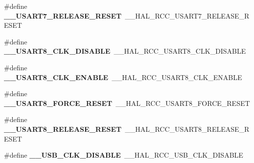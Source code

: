 \begin{DoxyCompactItemize}
\item 
\#define {\bfseries \+\_\+\+\_\+\+U\+S\+A\+R\+T7\+\_\+\+R\+E\+L\+E\+A\+S\+E\+\_\+\+R\+E\+S\+ET}~\+\_\+\+\_\+\+H\+A\+L\+\_\+\+R\+C\+C\+\_\+\+U\+S\+A\+R\+T7\+\_\+\+R\+E\+L\+E\+A\+S\+E\+\_\+\+R\+E\+S\+ET\hypertarget{group___h_a_l___r_c_c___aliased_gafa09a5eefe6ef876ceb35c5c7e927b90}{}\label{group___h_a_l___r_c_c___aliased_gafa09a5eefe6ef876ceb35c5c7e927b90}

\item 
\#define {\bfseries \+\_\+\+\_\+\+U\+S\+A\+R\+T8\+\_\+\+C\+L\+K\+\_\+\+D\+I\+S\+A\+B\+LE}~\+\_\+\+\_\+\+H\+A\+L\+\_\+\+R\+C\+C\+\_\+\+U\+S\+A\+R\+T8\+\_\+\+C\+L\+K\+\_\+\+D\+I\+S\+A\+B\+LE\hypertarget{group___h_a_l___r_c_c___aliased_ga156c3013249722a6533154a3c34cb8e5}{}\label{group___h_a_l___r_c_c___aliased_ga156c3013249722a6533154a3c34cb8e5}

\item 
\#define {\bfseries \+\_\+\+\_\+\+U\+S\+A\+R\+T8\+\_\+\+C\+L\+K\+\_\+\+E\+N\+A\+B\+LE}~\+\_\+\+\_\+\+H\+A\+L\+\_\+\+R\+C\+C\+\_\+\+U\+S\+A\+R\+T8\+\_\+\+C\+L\+K\+\_\+\+E\+N\+A\+B\+LE\hypertarget{group___h_a_l___r_c_c___aliased_gadd38e5a3ecd0dd0f8118af0447a096c9}{}\label{group___h_a_l___r_c_c___aliased_gadd38e5a3ecd0dd0f8118af0447a096c9}

\item 
\#define {\bfseries \+\_\+\+\_\+\+U\+S\+A\+R\+T8\+\_\+\+F\+O\+R\+C\+E\+\_\+\+R\+E\+S\+ET}~\+\_\+\+\_\+\+H\+A\+L\+\_\+\+R\+C\+C\+\_\+\+U\+S\+A\+R\+T8\+\_\+\+F\+O\+R\+C\+E\+\_\+\+R\+E\+S\+ET\hypertarget{group___h_a_l___r_c_c___aliased_ga3a8aed7e7c3dbbb9f4f93d298a813a13}{}\label{group___h_a_l___r_c_c___aliased_ga3a8aed7e7c3dbbb9f4f93d298a813a13}

\item 
\#define {\bfseries \+\_\+\+\_\+\+U\+S\+A\+R\+T8\+\_\+\+R\+E\+L\+E\+A\+S\+E\+\_\+\+R\+E\+S\+ET}~\+\_\+\+\_\+\+H\+A\+L\+\_\+\+R\+C\+C\+\_\+\+U\+S\+A\+R\+T8\+\_\+\+R\+E\+L\+E\+A\+S\+E\+\_\+\+R\+E\+S\+ET\hypertarget{group___h_a_l___r_c_c___aliased_ga2348b929f206d24fa5bd3c4b3315b13d}{}\label{group___h_a_l___r_c_c___aliased_ga2348b929f206d24fa5bd3c4b3315b13d}

\item 
\#define {\bfseries \+\_\+\+\_\+\+U\+S\+B\+\_\+\+C\+L\+K\+\_\+\+D\+I\+S\+A\+B\+LE}~\+\_\+\+\_\+\+H\+A\+L\+\_\+\+R\+C\+C\+\_\+\+U\+S\+B\+\_\+\+C\+L\+K\+\_\+\+D\+I\+S\+A\+B\+LE\hypertarget{group___h_a_l___r_c_c___aliased_ga008be7939856314751eb981d3d1b59a3}{}\label{group___h_a_l___r_c_c___aliased_ga008be7939856314751eb981d3d1b59a3}


\end{DoxyCompactItemize}
